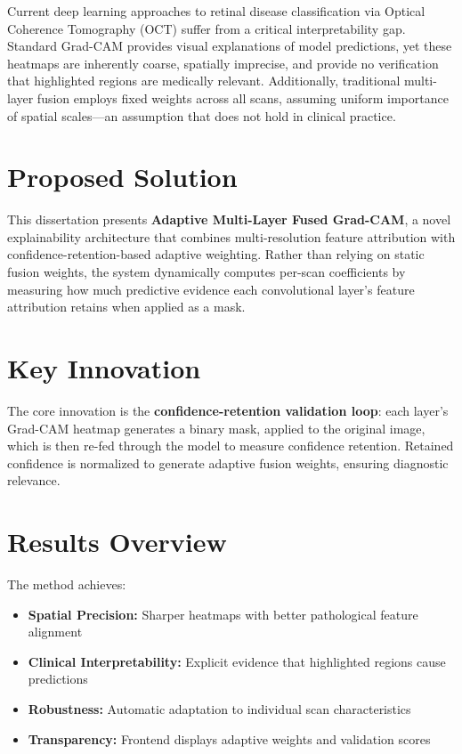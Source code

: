 \documentclass[12pt,a4paper,oneside]{book}
\begin{document}
Current deep learning approaches to retinal disease classification via Optical Coherence Tomography (OCT) suffer from a critical interpretability gap. Standard Grad-CAM provides visual explanations of model predictions, yet these heatmaps are inherently coarse, spatially imprecise, and provide no verification that highlighted regions are medically relevant. Additionally, traditional multi-layer fusion employs fixed weights across all scans, assuming uniform importance of spatial scales—an assumption that does not hold in clinical practice.

\section*{Proposed Solution}

This dissertation presents \textbf{Adaptive Multi-Layer Fused Grad-CAM}, a novel explainability architecture that combines multi-resolution feature attribution with confidence-retention-based adaptive weighting. Rather than relying on static fusion weights, the system dynamically computes per-scan coefficients by measuring how much predictive evidence each convolutional layer's feature attribution retains when applied as a mask.

\section*{Key Innovation}

The core innovation is the \textbf{confidence-retention validation loop}: each layer's Grad-CAM heatmap generates a binary mask, applied to the original image, which is then re-fed through the model to measure confidence retention. Retained confidence is normalized to generate adaptive fusion weights, ensuring diagnostic relevance.

\section*{Results Overview}

The method achieves:
\begin{itemize}
  \item \textbf{Spatial Precision:} Sharper heatmaps with better pathological feature alignment
  \item \textbf{Clinical Interpretability:} Explicit evidence that highlighted regions cause predictions
  \item \textbf{Robustness:} Automatic adaptation to individual scan characteristics
  \item \textbf{Transparency:} Frontend displays adaptive weights and validation scores
\end{itemize}
\end{document}
